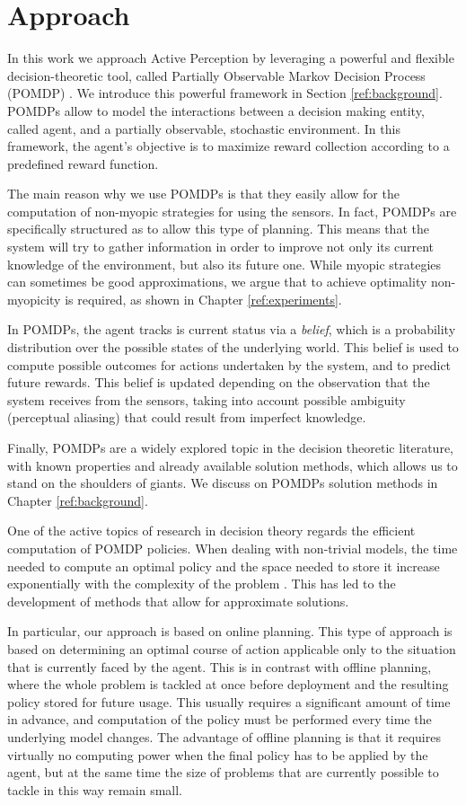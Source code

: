 \section{Approach}

In this work we approach Active Perception by leveraging a powerful and flexible decision-theoretic
tool, called Partially Observable Markov Decision Process (POMDP) \cite{cit:pomdp}. We introduce
this powerful framework in Section \ref{ref:background}. POMDPs allow to model the interactions
between a decision making entity, called agent, and a partially observable, stochastic environment.
In this framework, the agent's objective is to maximize reward collection according to a predefined
reward function.

The main reason why we use POMDPs is that they easily allow for the computation of non-myopic
strategies for using the sensors. In fact, POMDPs are specifically structured as to allow this type
of planning. This means that the system will try to gather information in order to improve not only
its current knowledge of the environment, but also its future one. While myopic strategies can
sometimes be good approximations, we argue that to achieve optimality non-myopicity is required, as
shown in Chapter \ref{ref:experiments}.

In POMDPs, the agent tracks is current status via a \textit{belief}, which is a probability
distribution over the possible states of the underlying world. This belief is used to compute
possible outcomes for actions undertaken by the system, and to predict future rewards. This belief
is updated depending on the observation that the system receives from the sensors, taking into
account possible ambiguity (perceptual aliasing) that could result from imperfect knowledge.

Finally, POMDPs are a widely explored topic in the decision theoretic literature, with known
properties and already available solution methods, which allows us to stand on the shoulders of giants.
We discuss on POMDPs solution methods in Chapter \ref{ref:background}.

One of the active topics of research in decision theory regards the efficient computation of POMDP
policies. When dealing with non-trivial models, the time needed to compute an optimal policy and the
space needed to store it increase exponentially with the complexity of the problem \cite{cit:pomdp}.
This has led to the development of methods that allow for approximate solutions.

In particular, our approach is based on online planning. This type of approach is based on
determining an optimal course of action applicable only to the situation that is currently faced by
the agent. This is in contrast with offline planning, where the whole problem is tackled at once
before deployment and the resulting policy stored for future usage. This usually requires a
significant amount of time in advance, and computation of the policy must be performed every time
the underlying model changes. The advantage of offline planning is that it requires virtually no
computing power when the final policy has to be applied by the agent, but at the same time the size
of problems that are currently possible to tackle in this way remain small.


